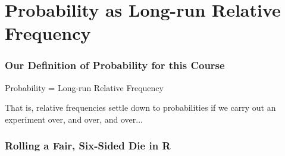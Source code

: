 \section{Probability as Long-run Relative Frequency}
\begin{frame}
\frametitle{Our Definition of Probability for this Course}
\begin{center}
\Large
Probability  = Long-run Relative Frequency
\end{center}

\vspace{3em}
\alert{That is, relative frequencies settle down to probabilities if we carry out an experiment over, and over, and over...}
\end{frame}
\begin{frame}[fragile]
  \frametitle{Rolling a Fair, Six-Sided Die in R}
  \small
\begin{knitrout}
\color{fgcolor}\begin{kframe}
\begin{alltt}
 \hlkwb{<-} \hlstd{(}\hlstd{)\{}
   \hlkwb{<-} 
   \hlkwb{<-} \hlstd{(}
    \hlstd{=} \hlstd{,}
        \hlstd{=}  \hlopt{==} 
\hlstd{\}}

\hlstd{(}\hlstd{)}
 \hlkwb{<-} \hlstd{(}\hlopt{:}\hlstd{,}  \hlstd{=} \hlstd{,}  \hlstd{=} \hlstd{)}
\end{alltt}
\end{kframe}
\end{knitrout}
\end{frame}
